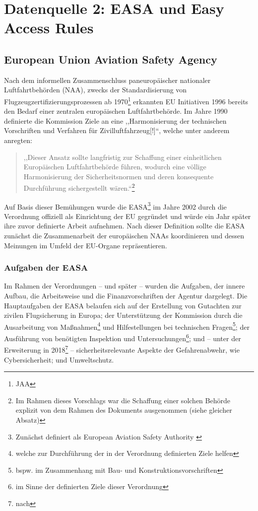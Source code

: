 \chapter{Datenquelle 2: EASA und Easy Access Rules}

\section{European Union Aviation Safety Agency}
    
    Nach dem informellen Zusammenschluss paneuropäischer nationaler Luftfahrtbehörden (\acs{NAA}), zwecks der Standardisierung von Flugzeugzertifizierungsprozessen ab 1970\footnote{\acf{JAA}} erkannten \ac{EU} Initiativen 1996 bereits den Bedarf einer zentralen europäischen Luftfahrtbehörde.
    Im Jahre 1990 definierte die Kommission Ziele an eine ,,Harmonisierung der technischen Vorschriften und Verfahren für Zivilluftfahrzeug[!]``\cite{kom_90_442}, welche unter anderem anregten: 
    
    \begin{quote}
        ,,Dieser Ansatz sollte langfristig zur Schaffung einer einheitlichen Europäischen Luftfahrtbehörde führen, wodurch eine völlige Harmonisierung der Sicherheitsnormen und deren konsequente Durchführung sichergestellt wären.``\footnote{Im Rahmen dieses Vorschlags war die Schaffung einer solchen Behörde explizit von dem Rahmen des Dokuments ausgenommen (siehe gleicher Absatz)} \cite[Begr. Art. 7 Abs. 2]{kom_90_442}
    \end{quote}
    Auf Basis dieser Bemühungen wurde die \acf{EASA}\footnote{Zunächst definiert als European Aviation Safety Authority \cite[2]{easa_framework}} im Jahre 2002 durch die Verordnung  offiziell als Einrichtung der \ac{EU} gegründet und würde ein Jahr später ihre zuvor definierte Arbeit aufnehmen.
    Nach dieser Definition sollte die \ac{EASA} zunächst die Zusammenarbeit der europäischen \acsp{NAA} koordinieren und dessen Meinungen im Umfeld der \ac{EU}-Organe repräsentieren. 
    \cite[§4.3]{easa_coman2018}

\subsection{Aufgaben der EASA}
    
    Im Rahmen der Verordnungen \textdagger{} -- und später  -- wurden die Aufgaben, der innere Aufbau, die Arbeitsweise und die Finanzvorschriften der Agentur dargelegt.
    Die Hauptaufgaben der \ac{EASA} belaufen sich auf der Erstellung von Gutachten zur zivilen Flugsicherung in Europa; der Unterstützung der Kommission durch die Ausarbeitung von Maßnahmen\footnote{welche zur Durchführung der in der Verordnung definierten Ziele helfen} und Hilfestellungen bei technischen Fragen\footnote{bspw. im Zusammenhang mit Bau- und Konstruktionsvorschriften}; der Ausführung von benötigten Inspektion und Untersuchungen\footnote{im Sinne der definierten Ziele dieser Verordnung}; und -- unter der Erweiterung in 2018\footnote{nach } -- sicherheitsrelevante Aspekte der Gefahrenabwehr, wie Cybersicherheit; und Umweltschutz. \cite{2008R0216_summary, 2018R1139_summary}
    
